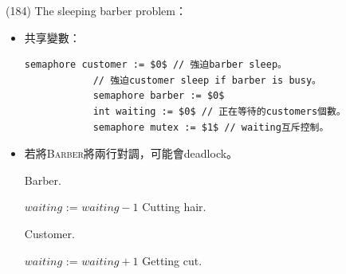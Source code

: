 \begin{theorem}{(184)} The sleeping barber problem：\begin{itemize}
        \item 共享變數：\begin{lstlisting}[caption={Shared variables of The sleeping barber problem.}, captionpos=b, mathescape=true]
            semaphore customer := $0$ // 強迫barber sleep。
            // 強迫customer sleep if barber is busy。
            semaphore barber := $0$ 
            int waiting := $0$ // 正在等待的customers個數。
            semaphore mutex := $1$ // waiting互斥控制。
        \end{lstlisting}
        \item 若將\textsc{Barber}將兩行對調，可能會deadlock。
        \begin{algorithm}[H]
            \caption{Barber.}
            \begin{algorithmic}[1]
                    \Repeat
                        \State {} 
                        \State {}
                        \State $waiting$ := $waiting - 1$
                        \State {} 
                        \State {}
                        \State Cutting hair.
                \EndFunction
            \end{algorithmic}
        \end{algorithm}
        \begin{algorithm}[H]
            \caption{Customer.}
            \begin{algorithmic}[1]
                    \Repeat
                        \State {}
                         
                            \State $waiting$ := $waiting + 1$
                            \State {}
                            \State {} 
                            \State {} 
                            \State Getting cut.
                        \Else
                            \State {}
                        \EndIf
                \EndFunction
            \end{algorithmic}
        \end{algorithm}
    \end{itemize}
\end{theorem}

